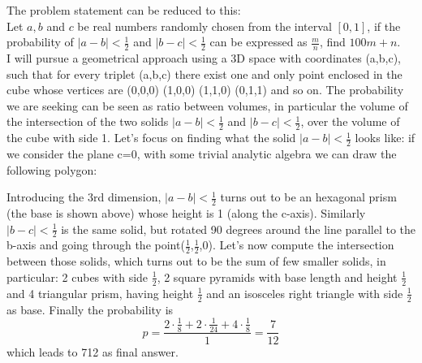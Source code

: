 \begin{solution}\hfil\medskip

    The problem statement can be reduced to this: \\

    Let \(a,b\) and \(c\) be real numbers randomly chosen from the interval $[0,1]$, if the probability of $|a-b|<\frac{1}{2}$ and $|b-c| <\frac{1}{2}$ can be expressed as $\frac{m}{n}$, find $100m+n$.\\


    I will pursue a geometrical approach using a 3D space with coordinates (a,b,c), such that for every triplet (a,b,c) there exist one and only point enclosed in the cube whose vertices are (0,0,0) (1,0,0) (1,1,0) (0,1,1) and so on. The probability we are seeking can be seen as ratio between volumes, in particular the volume of the intersection of the two solids $|a-b|<\frac{1}{2}$ and $|b-c| <\frac{1}{2}$, over the volume of the cube with side 1. Let's focus on finding what the solid $|a-b|<\frac{1}{2}$ looks like: if we consider the plane c=0, with some trivial analytic algebra we can draw the following polygon:
    \begin{figure}[ht]
        \centering
    \end{figure}
    Introducing the 3rd dimension, $|a-b|<\frac{1}{2}$ turns out to be an hexagonal prism (the base is shown above) whose height is 1 (along the c-axis). Similarly $|b-c| <\frac{1}{2}$ is the same solid, but rotated 90 degrees around the line parallel to the b-axis and going through the point($\frac{1}{2}$,$\frac{1}{2}$,$0$). Let's now compute the intersection between those solids, which turns out to be the sum of few smaller solids, in particular: 2 cubes with side $\frac{1}{2}$, 2 square pyramids with base length and height $\frac{1}{2}$ and 4 triangular prism, having height $\frac{1}{2}$ and an isosceles right triangle with side $\frac{1}{2}$ as base. Finally  the probability is $$\displaystyle p=\frac{2\cdot\frac{1}{8}+2\cdot\frac{1}{24}+4\cdot\frac{1}{8}}{1}=\frac{7}{12}$$ which leads to 712 as final answer.
\end{solution}\bigskip
